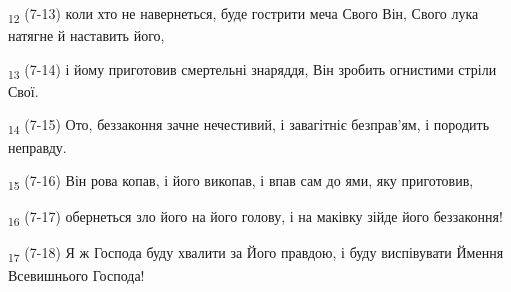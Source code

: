 \begin{tcolorbox}
\textsubscript{12} (7-13) коли хто не навернеться, буде гострити меча Свого Він, Свого лука натягне й наставить його,
\end{tcolorbox}
\begin{tcolorbox}
\textsubscript{13} (7-14) і йому приготовив смертельні знаряддя, Він зробить огнистими стріли Свої.
\end{tcolorbox}
\begin{tcolorbox}
\textsubscript{14} (7-15) Ото, беззаконня зачне нечестивий, і завагітніє безправ'ям, і породить неправду.
\end{tcolorbox}
\begin{tcolorbox}
\textsubscript{15} (7-16) Він рова копав, і його викопав, і впав сам до ями, яку приготовив,
\end{tcolorbox}
\begin{tcolorbox}
\textsubscript{16} (7-17) обернеться зло його на його голову, і на маківку зійде його беззаконня!
\end{tcolorbox}
\begin{tcolorbox}
\textsubscript{17} (7-18) Я ж Господа буду хвалити за Його правдою, і буду виспівувати Ймення Всевишнього Господа!
\end{tcolorbox}
